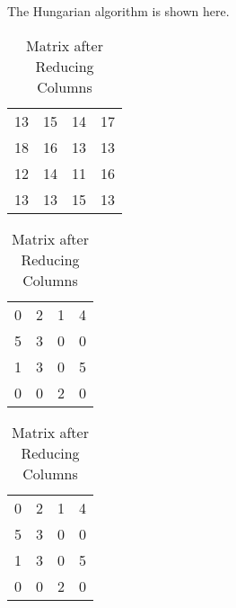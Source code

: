 %
%

\begin{subquestions}


\subquestion

The Hungarian algorithm is shown here.

\begin{table}[!hbt]
	\begin{minipage}{0.3\textwidth}
		\centering
		\begin{tabular}{cccc}
			13 & 15 & 14 & 17 \\
			18 & 16 & 13 & 13 \\
			12 & 14 & 11 & 16 \\
			13 & 13 & 15 & 13 \\
		\end{tabular}
		\captionsetup{width=1.1\linewidth}
		\caption*{Matrix From question}
	\end{minipage}
	\hspace{20pt}
	\begin{minipage}{0.3\textwidth}
		\centering
		\begin{tabular}{cccc}
			0 & 2 & 1 & 4 \\
			5 & 3 & 0 & 0 \\
			1 & 3 & 0 & 5 \\
			0 & 0 & 2 & 0 \\
		\end{tabular}
		\captionsetup{width=1.1\linewidth}
		\caption*{Matrix after Reducing Rows}
	\end{minipage}
	\hspace{20pt}
	\begin{minipage}{0.3\textwidth}
		\centering
		\begin{tabular}{cccc}
			0 & 2 & 1 & 4 \\
			5 & 3 & 0 & 0 \\
			1 & 3 & 0 & 5 \\
			0 & 0 & 2 & 0 \\
		\end{tabular}
		\captionsetup{width=1.1\linewidth}
		\caption*{Matrix after Reducing Columns} 
	\end{minipage}
	

\end{table}
\end{subquestions}

